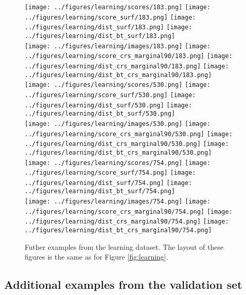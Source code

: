 \begin{figure}
	\begin{center}
		\texttt{[image: ../figures/learning/scores/183.png]}
		\texttt{[image: ../figures/learning/score\_surf/183.png]}	\texttt{[image: ../figures/learning/dist\_surf/183.png]}
		\texttt{[image: ../figures/learning/dist\_bt\_surf/183.png]}\\
		\texttt{[image: ../figures/learning/images/183.png]}
		\texttt{[image: ../figures/learning/score\_crs\_marginal90/183.png]}
		\texttt{[image: ../figures/learning/dist\_crs\_marginal90/183.png]}
		\texttt{[image: ../figures/learning/dist\_bt\_crs\_marginal90/183.png]}\\
		\vspace{0.5cm}
		\texttt{[image: ../figures/learning/scores/530.png]}
		\texttt{[image: ../figures/learning/score\_surf/530.png]}	\texttt{[image: ../figures/learning/dist\_surf/530.png]}
		\texttt{[image: ../figures/learning/dist\_bt\_surf/530.png]}\\
		\texttt{[image: ../figures/learning/images/530.png]}
		\texttt{[image: ../figures/learning/score\_crs\_marginal90/530.png]}
		\texttt{[image: ../figures/learning/dist\_crs\_marginal90/530.png]}
		\texttt{[image: ../figures/learning/dist\_bt\_crs\_marginal90/530.png]}\\
		\vspace{0.5cm}
		\texttt{[image: ../figures/learning/scores/754.png]}
		\texttt{[image: ../figures/learning/score\_surf/754.png]}	\texttt{[image: ../figures/learning/dist\_surf/754.png]}
		\texttt{[image: ../figures/learning/dist\_bt\_surf/754.png]}\\
		\texttt{[image: ../figures/learning/images/754.png]}
		\texttt{[image: ../figures/learning/score\_crs\_marginal90/754.png]}
		\texttt{[image: ../figures/learning/dist\_crs\_marginal90/754.png]}
		\texttt{[image: ../figures/learning/dist\_bt\_crs\_marginal90/754.png]}
	\end{center}
	\caption{Futher examples from the learning dataset. The layout of these figures is the same as for Figure \ref{fig:learning}.}
	\label{fig:learning3}
\end{figure}

\newpage
\subsection{Additional examples from the validation set}

